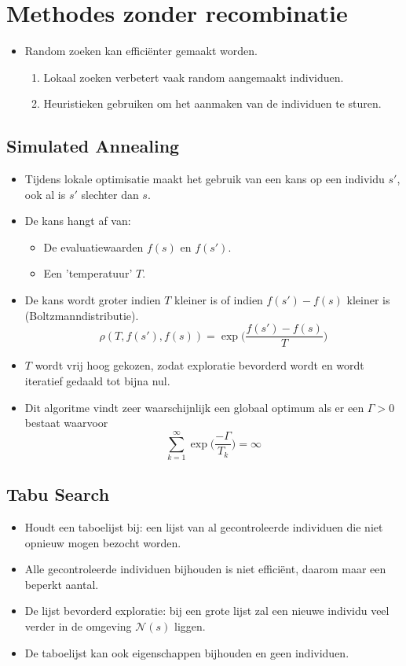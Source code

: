 \section{Methodes zonder recombinatie}
\begin{itemize}
    \item Random zoeken kan efficiënter gemaakt worden.
    \begin{enumerate}
        \item Lokaal zoeken verbetert vaak random aangemaakt individuen.
        \item Heuristieken gebruiken om het aanmaken van de individuen te sturen.
    \end{enumerate}
\end{itemize}

\subsection{Simulated Annealing}
\begin{itemize}
    \item Tijdens lokale optimisatie maakt het gebruik van een kans op een individu $s'$, ook al is $s'$ slechter dan $s$.
    \item De kans hangt af van:
    \begin{itemize}
        \item De evaluatiewaarden $f(s)$ en $f(s')$.
        \item Een 'temperatuur' $T$.
    \end{itemize}
    \item De kans wordt groter indien $T$ kleiner is of indien $f(s') - f(s)$ kleiner is (Boltzmanndistributie).
    $$\rho(T, f(s'), f(s)) = \exp\bigg(\frac{f(s') - f(s)}{T}\bigg)$$
    \item $T$ wordt vrij hoog gekozen, zodat exploratie bevorderd wordt en wordt iteratief gedaald tot bijna nul.
    \item Dit algoritme vindt zeer waarschijnlijk een globaal optimum als er een $\Gamma > 0$ bestaat waarvoor
    $$\sum_{k = 1}^{\infty} \exp\bigg(\frac{-\Gamma}{T_k}\bigg) = \infty $$
\end{itemize}

\subsection{Tabu Search}
\begin{itemize}
    \item Houdt een taboelijst bij: een lijst van al gecontroleerde individuen die niet opnieuw mogen bezocht worden.
    \item Alle gecontroleerde individuen bijhouden is niet efficiënt, daarom maar een beperkt aantal.
    \item De lijst bevorderd exploratie: bij een grote lijst zal een nieuwe individu veel verder in de omgeving $\mathcal{N}(s)$ liggen.
    \item De taboelijst kan ook eigenschappen bijhouden en geen individuen.
\end{itemize}

